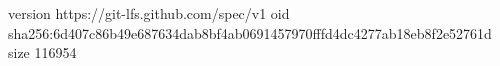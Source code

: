 version https://git-lfs.github.com/spec/v1
oid sha256:6d407c86b49e687634dab8bf4ab0691457970fffd4dc4277ab18eb8f2e52761d
size 116954
